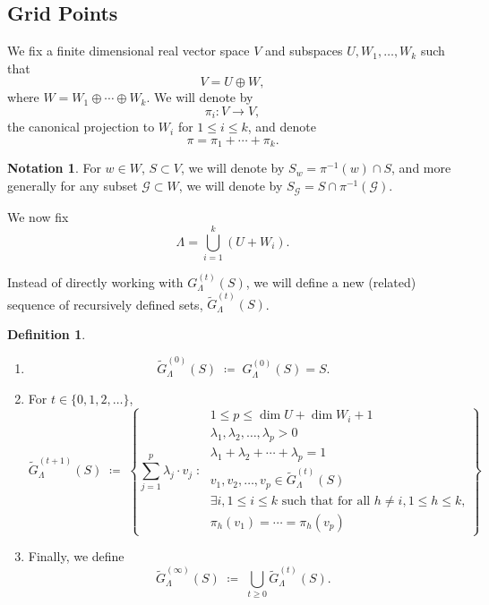 \documentclass[10pt]{amsart}
\theoremstyle{plain}
\theoremstyle{definition}
\newtheorem{definition}[lemma]{Definition}
\newtheorem{notation}[lemma]{Notation}
\providecommand{\cG}[0]{\ensuremath{\mathcal G}\xspace}
\let\leq\leqslant
\let\geq\geqslant
\providecommand{\defeq}[0]{\ensuremath{\;\coloneqq\;}\xspace}
\begin{document}
\subsection{Grid Points}
\label{subsec:grid}

We fix a finite dimensional real vector space $V$ and subspaces $U,W_1,\ldots,W_k$ such that 
\[
V = U \oplus W,
\]
where $W = W_1 \oplus \cdots \oplus W_k$.
We will denote by 
\[
\pi_i:V \rightarrow V, 
\]
the canonical projection to $W_i$ for $1 \leq i \leq k$, and denote 
\[
\pi = \pi_1+\cdots+\pi_k.
\]

\begin{notation}
\label{not:fibers}
For $w \in W$, $S \subset V$, we will denote by 
$S_w = \pi^{-1}(w) \cap S$, and more generally for any subset 
$\cG \subset W$, we will denote by $S_\cG = S \cap \pi^{-1}(\cG)$.
\end{notation}

We now fix 
\[
\Lambda = \bigcup_{i=1}^k (U+W_i).
\]




Instead of directly working with $G^{(t)}_\Lambda(S)$, we will define a new (related) sequence of recursively defined sets, $\widetilde{G}^{(t)}_\Lambda(S)$. 
\begin{definition}
\label{def:T}
   \begin{enumerate}[1.] 
    \item 
        $$ \widetilde{G}^{(0)}_\Lambda(S) \defeq G^{(0)}_\Lambda(S) =S.$$
    \item 
        For $t\in\{0,1,2,\dotsc\}$, 
        $$ \widetilde{G}^{(t+1)}_\Lambda(S) \defeq \left\{
            \sum_{j=1}^p \lambda_j\cdot v_j \;\colon\; \begin{matrix}
                1 \leq p \leq \dim U + \dim W_i +1 \\ \lambda_1,\lambda_2,\dotsc, \lambda_p > 0 \\
                \lambda_1 + \lambda_2 + \dotsi + \lambda_p = 1 \\
                v_1, v_2, \dotsc, v_p \in \widetilde{G}^{(t)}_\Lambda(S)\\
                \text{$\exists i, 1\leq i \leq k$ such that for all $h \neq i, 1 \leq h \leq k$,} \\
                \pi_h(v_1) = \cdots =\pi_h(v_p)
            \end{matrix}
        \right\}$$
    \item  
        Finally, we define
        $$\widetilde{G}^{(\infty)}_\Lambda(S) \defeq \bigcup\limits_{t\geq 0}\widetilde{G}^{(t)}_\Lambda(S).$$
\end{enumerate} 
\end{definition}
\end{document}
